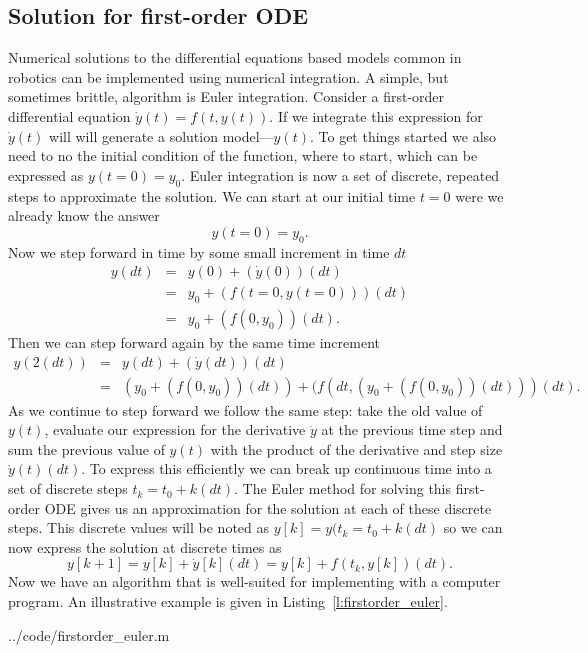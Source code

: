 \subsection{Solution for first-order ODE}
Numerical solutions to the differential equations based models common in robotics can be implemented using numerical integration.  A simple, but sometimes brittle, algorithm is Euler integration.  Consider a first-order differential equation $\dot{y}(t)=f(t,y(t))$.  If we integrate this expression for $\dot{y}(t)$ will will generate a solution model---$y(t)$.   To get things started we also need to no the initial condition of the function, where to start, which can be expressed as $y(t=0)=y_0$.  Euler integration is now a set of discrete, repeated steps to approximate the solution.  We can start at our initial time $t=0$ were we already know the answer
\[
y(t=0) = y_0.
\]
Now we step forward in time by some small increment in time $dt$ 
\begin{eqnarray}
y(dt) & = & y(0) + \left(\dot{y}(0)\right)(dt) \\
      & = & y_0 + (f(t=0,y(t=0)))(dt) \\
      & = & y_0 + (f(0,y_0))(dt).
\end{eqnarray}
Then we can step forward again by the same time increment
\begin{eqnarray}
y(2(dt)) & = & y(dt) + \left(\dot{y}(dt)\right)(dt) \\
         & = & \left(y_0 + (f(0,y_0))(dt)\right) + (f(dt,(y_0 + (f(0,y_0))(dt)))(dt).
\end{eqnarray}
As we continue to step forward we follow the same step: take the old value of $y(t)$, evaluate our expression for the derivative $\dot{y}$ at the previous time step and sum the previous value of $y(t)$ with the product of the derivative and step size $\dot{y}(t)(dt)$.  To express this efficiently we can break up continuous time into a set of discrete steps $t_k = t_0+k(dt)$.  The Euler method for solving this first-order ODE gives us an approximation for the solution at each of these discrete steps. This discrete values will be noted as $y[k] = y(t_k=t_0+k(dt)$ so we can now express the solution at discrete times as
\[
y[k+1] = y[k] + \dot{y}[k](dt) = y[k] + f(t_k,y[k])(dt).
\]
Now we have an algorithm that is well-suited for implementing with a computer program.  An illustrative example is given in Listing~\ref{l:firstorder_euler}.

{../code/firstorder_euler.m}

